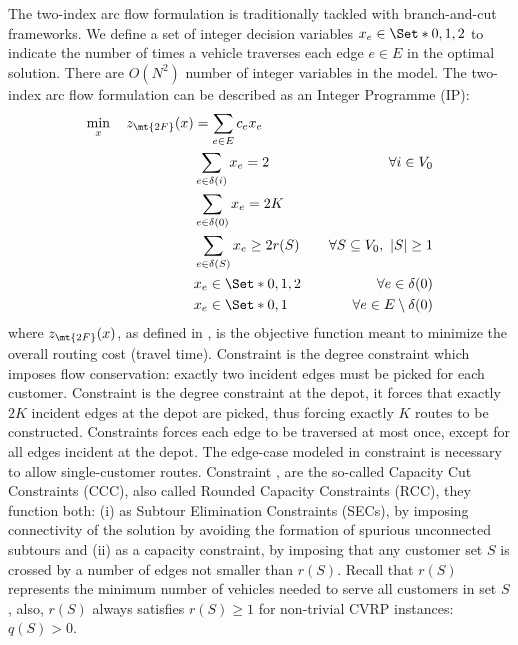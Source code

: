 The two-index arc flow formulation is traditionally tackled with branch-and-cut frameworks.
We define a set of integer decision variables $x_e \in \Set*{0, 1, 2}$ to indicate the number of times
a vehicle traverses each edge $e \in E$ in the optimal solution.
There are $O(N^2)$ number of integer variables in the model.
The two-index arc flow formulation can be described as an Integer Programme (IP):
\begin{align}
	\min_{x} \quad z_\mt{2F}(x) & = \sum_{e \in E} c_e x_e \label{eq:two-index-flow-obj-func}                                                                                        \\
	                            & \sum_{e \in \delta(i)} x_e = 2                              & \quad \forall i \in V_0 \label{eq:two-index-flow-two-edges-incident-per-customer}    \\
	                            & \sum_{e \in \delta(0)} x_e = 2 K                            & \label{eq:two-index-flow-two-k-edges-incident-in-the-depot-node}                     \\
	                            & \sum_{e \in \delta(S)} x_e \ge 2 r(S)                       & \quad \forall S \subseteq V_0,\ |S| \ge 1 \label{eq:two-index-flow-ccc}              \\
	                            & x_e                   \in \Set*{0, 1, 2}                    & \quad \forall e \in \delta(0) \label{eq:two-index-flow-x-mip-var-bounds-depot}       \\
	                            & x_e                   \in \Set*{0, 1}                       & \quad \forall e \in E \setminus \delta(0) \label{eq:two-index-flow-x-mip-var-bounds}
\end{align}
where $z_\mt{2F}(x)$, as defined in , is the objective function meant to minimize the overall routing cost (travel time).
Constraint  is the degree constraint which imposes flow conservation: exactly two incident edges must be picked for each customer.
Constraint  is the degree constraint at the depot, it forces that exactly $2K$ incident edges at the depot are picked, thus forcing exactly $K$ routes to be constructed.
Constraints  forces each edge to be traversed at most once,
except for all edges incident at the depot.
The edge-case modeled in constraint  is necessary to allow single-customer routes.
Constraint , are the so-called Capacity Cut Constraints (CCC), also called Rounded Capacity Constraints (RCC), they function both:
(i) as Subtour Elimination Constraints (SECs),
by imposing connectivity of the solution by avoiding the formation of spurious unconnected subtours
and (ii) as a capacity constraint,
by imposing that any customer set $S$ is crossed by a number of edges not smaller than $r(S)$.
Recall that $r(S)$ represents the minimum number of vehicles needed to serve all customers in set $S$,
also, $r(S)$ always satisfies $r(S) \ge 1$ for non-trivial CVRP instances: $q(S) > 0$.


